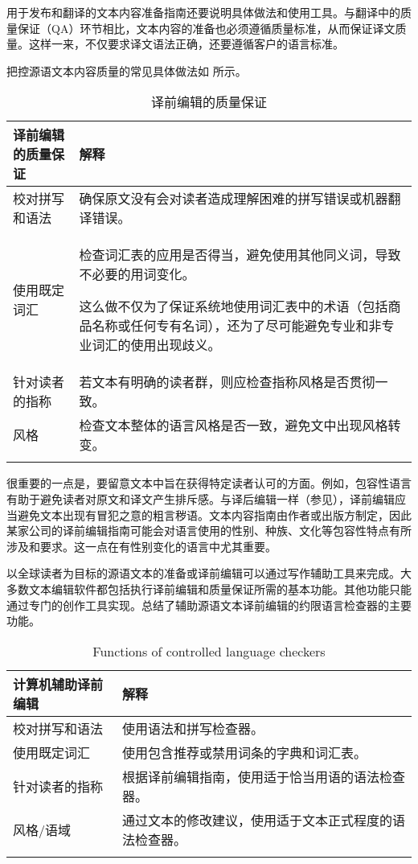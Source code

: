 \documentclass[output=paper,colorlinks,citecolor=brown]{langscibook}
\begin{document}
用于发布和翻译的文本内容准备指南还要说明具体做法和使用工具。与翻译中的质量保证（QA）环节相比，文本内容的准备也必须遵循质量标准，从而保证译文质量。这样一来，不仅要求译文语法正确，还要遵循客户的语言标准。

把控源语文本内容质量的常见具体做法如 所示。

\begin{table}[t]
\begin{tabularx}{\textwidth}{QQ}
\lsptoprule
{译前编辑的质量保证} & {解释}\\
\midrule

校对拼写和语法 & 确保原文没有会对读者造成理解困难的拼写错误或机器翻译错误。\\
\tablevspace

使用既定词汇 & 检查词汇表的应用是否得当，避免使用其他同义词，导致不必要的用词变化。

这么做不仅为了保证系统地使用词汇表中的术语（包括商品名称或任何专有名词），还为了尽可能避免专业和非专业词汇的使用出现歧义。\\
\tablevspace

针对读者的指称 & 若文本有明确的读者群，则应检查指称风格是否贯彻一致。\\
\tablevspace

风格 & 检查文本整体的语言风格是否一致，避免文中出现风格转变。 \\
\lspbottomrule
\end{tabularx}
\caption{译前编辑的质量保证}
\label{tab:sanchez:4}
\end{table}

很重要的一点是，要留意文本中旨在获得特定读者认可的方面。例如，包容性语言有助于避免读者对原文和译文产生排斥感。与译后编辑一样（参见），译前编辑应当避免文本出现有冒犯之意的粗言秽语。文本内容指南由作者或出版方制定，因此某家公司的译前编辑指南可能会对语言使用的性别、种族、文化等包容性特点有所涉及和要求。这一点在有性别变化的语言中尤其重要。

以全球读者为目标的源语文本的准备或译前编辑可以通过写作辅助工具来完成。大多数文本编辑软件都包括执行译前编辑和质量保证所需的基本功能。其他功能只能通过专门的创作工具实现。总结了辅助源语文本译前编辑的约限语言检查器的主要功能。

\begin{table}
\begin{tabularx}{\textwidth}{lQ}
\lsptoprule
{计算机辅助译前编辑} & {解释}\\
\midrule
校对拼写和语法 & 使用语法和拼写检查器。\\
\tablevspace

使用既定词汇 & 使用包含推荐或禁用词条的字典和词汇表。\\
\tablevspace

针对读者的指称 & 根据译前编辑指南，使用适于恰当用语的语法检查器。\\
\tablevspace

风格/语域 & 通过文本的修改建议，使用适于文本正式程度的语法检查器。\\
\lspbottomrule
\end{tabularx}
\caption{Functions of controlled language checkers}
\label{tab:sanchez:5}
\end{table}
\end{document}
